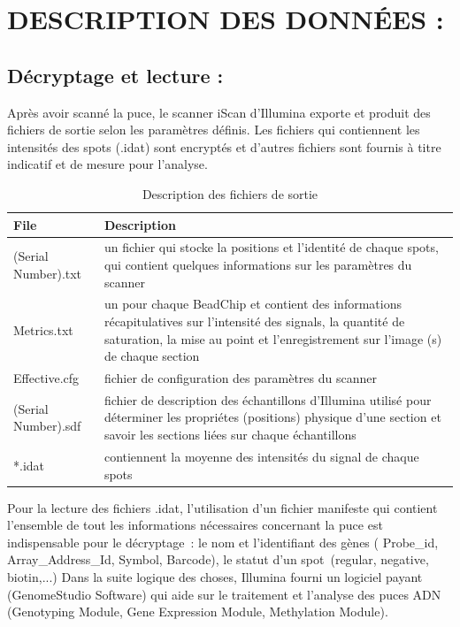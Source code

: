 \documentclass[a4paper,10pt]{article}
\begin{document}
\section{DESCRIPTION DES DONN\'{E}ES :}
\subsection{ Décryptage et lecture :}
Après avoir scanné la puce, le scanner iScan d’Illumina exporte et produit des fichiers de sortie selon les paramètres définis.
Les fichiers qui contiennent les intensités des spots (.idat) sont encryptés et d’autres fichiers sont fournis à titre indicatif et de mesure pour l’analyse.\\
\begin{table}[!ht]
\begin{tabular}{|l|p{9cm}|}
\hline
File  & Description \\
\hline
 (Serial Number).txt & un fichier qui stocke la positions et l'identité de chaque spots, qui contient quelques informations sur les paramètres du scanner\\
\hline
Metrics.txt &  un pour chaque BeadChip  et contient des informations récapitulatives sur l'intensité des signals,
la quantité de saturation, la mise au point et l'enregistrement sur l'image (s) de chaque section \\
\hline 
Effective.cfg & fichier de configuration des paramètres du scanner\\
\hline
(Serial Number).sdf & fichier de description des échantillons d'Illumina utilisé pour déterminer les propriétes (positions)
physique d'une section et savoir les sections liées sur chaque échantillons\\
\hline
*.idat & contiennent la moyenne des intensités du signal de chaque spots \\
\hline
\end{tabular}
\caption{Description des fichiers de sortie}
\label{Fichiers_Sorties}
\end{table}
\newline
Pour la lecture  des fichiers .idat, l’utilisation d’un fichier manifeste qui contient l’ensemble de tout les informations nécessaires concernant la puce est indispensable pour le décryptage : le nom et l’identifiant  des gènes ( Probe\_id, Array\_Address\_Id, Symbol, Barcode), le statut d’un spot (regular, negative, biotin,...)
Dans la suite logique des choses, Illumina fourni un logiciel payant (GenomeStudio Software)  qui aide sur le traitement et l'analyse des puces ADN (Genotyping Module, Gene Expression Module, Methylation Module).
\end{document}
